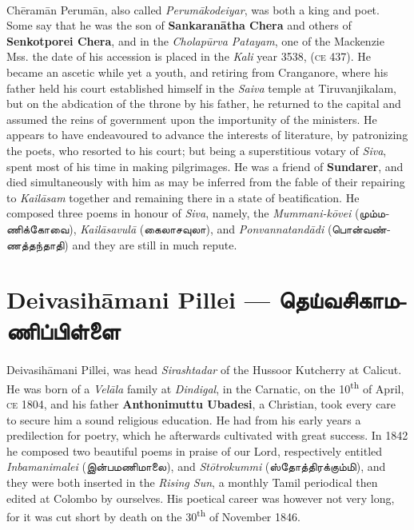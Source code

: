 \documentclass{article}
\newcommand{\TamilText}[1]{\texttamil{#1}}
\newcommand{\TamilBold}[1]{\texttamil{\textbf{#1}}}
\newcommand{\tam}[1]{\TamilText{#1}}
\newcommand{\tambold}[1]{\TamilBold{#1}}
\begin{document}
\paragraph{}
Ch\={e}ram\={a}n Perum\={a}n, also called \emph{Perum\={a}kodeiyar}, was both a king and poet. Some say that he was the son of \textbf{Sankaran\={a}tha Chera} and others of \textbf{Senkotporei Chera}, and in the \emph{Cholap\={u}rva Patayam}, one of the Mackenzie Mss. the date of his accession is placed in the \emph{Kali} year 3538, (\textsc{ce} 437). He became an ascetic while yet a youth, and retiring from Cranganore, where his father held his court established himself in the \emph{Saiva} temple at Tiruvanjikalam, but on the abdication of the throne by his father, he returned to the capital and assumed the reins of government upon the importunity of the ministers. He appears to have endeavoured to advance the interests of literature, by patronizing the poets, who resorted to his court; but being a superstitious votary of \emph{Siva}, spent most of his time in making pilgrimages. He was a friend of \textbf{Sundarer}, and died simultaneously with him as may be inferred from the fable of their repairing to \emph{Kail\={a}sam} together and remaining there in a state of beatification. He composed three poems in honour of \emph{Siva}, namely, the \emph{Mummani-k\={o}vei} (\tam{மும்மணிக்கோவை}), \emph{Kail\={a}savul\={a}} (\tam{கைலாசவுலா}), and \emph{Ponvannatand\={a}di} (\tam{பொன்வண்ணத்தந்தாதி}) and they are still in much repute.

\section{Deivasih\={a}mani Pillei --- \tambold{தெய்வசிகாமணிப்பிள்ளை}}
\paragraph{}
Deivasih\={a}mani Pillei, was head \emph{Sirashtadar} of the Hussoor Kutcherry at Calicut. He was born of a \emph{Vel\={a}la} family at \emph{Dindigal}, in the Carnatic, on the 10\textsuperscript{th} of April, \textsc{ce} 1804, and his father \textbf{Anthonimuttu Ubadesi}, a Christian, took every care to secure him a sound religious education. He had from his early years a predilection for poetry, which he afterwards cultivated with great success. In 1842 he composed two beautiful poems in praise of our Lord, respectively entitled \emph{Inbamanimalei} (\tam{இன்பமணிமாலை}), and \emph{St\={o}trokummi} (\tam{ஸ்தோத்திரக்கும்மி}), and they were both inserted in the \emph{Rising Sun}, a monthly Tamil periodical then edited at Colombo by ourselves. His poetical career was however not very long, for it was cut short by death on the 30\textsuperscript{th} of November 1846.
\end{document}
